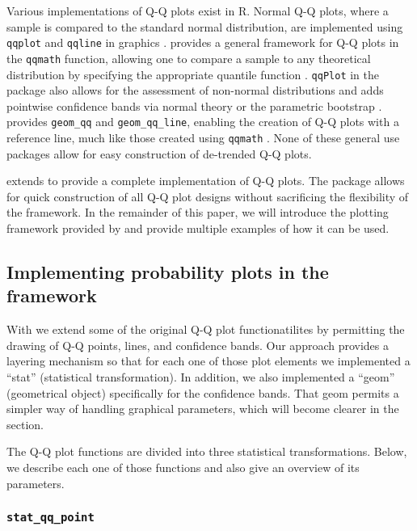 Various implementations of Q-Q plots exist in R. Normal Q-Q plots, where
a sample is compared to the standard normal distribution, are
implemented using \texttt{qqplot} and \texttt{qqline} in 
graphics \citep{R}.  provides a general framework for Q-Q
plots in the \texttt{qqmath} function, allowing one to compare a sample
to any theoretical distribution by specifying the appropriate quantile
function \citep{lattice}. \texttt{qqPlot} in the  package also
allows for the assessment of non-normal distributions and adds pointwise
confidence bands via normal theory or the parametric bootstrap
\citep{car}.  provides \texttt{geom\_qq} and
\texttt{geom\_qq\_line}, enabling the creation of Q-Q plots with a
reference line, much like those created using \texttt{qqmath}
\citep{ggplot2}. None of these general use packages allow for easy
construction of de-trended Q-Q plots.

 extends  to provide a complete implementation
of Q-Q plots. The package allows for quick construction of all Q-Q plot
designs without sacrificing the flexibility of the 
framework. In the remainder of this paper, we will introduce the
plotting framework provided by  and provide multiple
examples of how it can be used.

\subsection{\texorpdfstring{Implementing probability plots in the
framework}{Implementing probability plots in the  framework}}\label{implementing-probability-plots-in-the-framework}

With  we extend some of the original  Q-Q plot
functionatilites by permitting the drawing of Q-Q points, lines, and
confidence bands. Our approach provides a  layering
mechanism so that for each one of those plot elements we implemented a
 ``stat'' (statistical transformation). In addition, we
also implemented a  ``geom'' (geometrical object)
specifically for the confidence bands. That geom permits a simpler way
of handling graphical parameters, which will become clearer in the
 section.

The Q-Q plot functions are divided into three statistical
transformations. Below, we describe each one of those functions and also
give an overview of its parameters.

\subsubsection{\texorpdfstring{\texttt{stat\_qq\_point}}{stat\_qq\_point}}\label{stat_qq_point}

